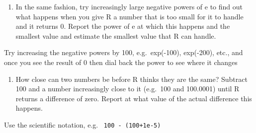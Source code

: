 \documentclass[
  letterpaper,
  DIV=11,
  numbers=noendperiod]{scrreprt}
\newenvironment{Shaded}{\begin{snugshade}}{\end{snugshade}}
\providecommand{\tightlist}{%
  \setlength{\itemsep}{0pt}\setlength{\parskip}{0pt}}\usepackage{longtable,booktabs,array}
\begin{document}
\begin{enumerate}
\def\labelenumi{\arabic{enumi}.}
\setcounter{enumi}{3}
\tightlist
\item
  In the same fashion, try increasingly large negative powers of e to
  find out what happens when you give R a number that is too small for
  it to handle and it returns 0. Report the power of e at which this
  happens and the smallest value and estimate the smallest value that R
  can handle.
\end{enumerate}

\begin{Shaded}
\begin{Highlighting}[]

\end{Highlighting}
\end{Shaded}

\begin{tcolorbox}[enhanced jigsaw, arc=.35mm, colframe=quarto-callout-caution-color-frame, left=2mm, opacitybacktitle=0.6, breakable, title=\textcolor{quarto-callout-caution-color}{\faFire}\hspace{0.5em}{Hint}, toprule=.15mm, coltitle=black, bottomtitle=1mm, toptitle=1mm, colback=white, leftrule=.75mm, colbacktitle=quarto-callout-caution-color!10!white, titlerule=0mm, opacityback=0, rightrule=.15mm, bottomrule=.15mm]

Try increasing the negative powers by 100, e.g.~exp(-100), exp(-200),
etc., and once you see the result of 0 then dial back the power to see
where it changes

\end{tcolorbox}

\begin{enumerate}
\def\labelenumi{\arabic{enumi}.}
\setcounter{enumi}{4}
\tightlist
\item
  How close can two numbers be before R thinks they are the same?
  Subtract 100 and a number increasingly close to it (e.g.~100 and
  100.0001) until R returns a difference of zero. Report at what value
  of the actual difference this happens.
\end{enumerate}

\begin{Shaded}
\begin{Highlighting}[]

\end{Highlighting}
\end{Shaded}

\begin{tcolorbox}[enhanced jigsaw, arc=.35mm, colframe=quarto-callout-caution-color-frame, left=2mm, opacitybacktitle=0.6, breakable, title=\textcolor{quarto-callout-caution-color}{\faFire}\hspace{0.5em}{Hint}, toprule=.15mm, coltitle=black, bottomtitle=1mm, toptitle=1mm, colback=white, leftrule=.75mm, colbacktitle=quarto-callout-caution-color!10!white, titlerule=0mm, opacityback=0, rightrule=.15mm, bottomrule=.15mm]

Use the scientific notation, e.g.~ \texttt{100\ -\ (100+1e-5)}

\end{tcolorbox}
\end{document}
